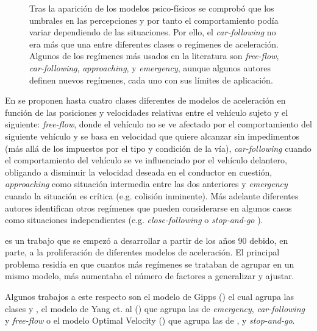 \begin{figure}
	\centering
	\caption{Tras la aparición de los modelos psico-físicos se comprobó que los umbrales en las percepciones y por tanto el comportamiento podía variar dependiendo de las situaciones. Por ello, el \textit{car-following} no era más que una entre diferentes clases o regímenes de aceleración. Algunos de los regímenes más usados en la literatura son \textit{free-flow}, \textit{car-following}, \textit{approaching}, y \textit{emergency}, aunque algunos autores definen nuevos regímenes, cada uno con sus límites de aplicación.}
	\label{fig:acceleration-model-classes}
\end{figure}

En \cite{wiedemann1992microscopic} se proponen hasta cuatro clases diferentes de modelos de aceleración en función de las posiciones y velocidades relativas entre el vehículo sujeto y el siguiente: \textit{free-flow}, donde el vehículo no se ve afectado por el comportamiento del siguiente vehículo y se basa en velocidad que quiere alcanzar sin impedimentos (más allá de los impuestos por el tipo y condición de la vía), \textit{car-following} cuando el comportamiento del vehículo se ve influenciado por el vehículo delantero, obligando a disminuir la velocidad deseada en el conductor en cuestión, \textit{approaching} como situación intermedia entre las dos anteriores y \textit{emergency} cuando la situación es crítica (e.g. colisión inminente). Más adelante diferentes autores identifican otros regímenes que pueden considerarse en algunos casos como situaciones independientes (e.g. \textit{close-following} o \textit{stop-and-go} \cite{Toledo2003, Liu2013}).

 es un trabajo que se empezó a desarrollar a partir de los años $90$ debido, en parte, a la proliferación de diferentes modelos de aceleración. El principal problema residía en que cuantos más regímenes se trataban de agrupar en un mismo modelo, más aumentaba el número de factores a generalizar y ajustar.

Algunos trabajos a este respecto son el modelo de Gipps (\cite{Gipps1981}) el cual agrupa las clases \textit{} y \textit{}, el modelo de Yang et. al (\cite{Yang1996}) que agrupa las de \textit{emergency}, \textit{car-following} y \textit{free-flow} o el modelo Optimal Velocity (\cite{Bando1998}) que agrupa las de \textit{}, \textit{} y \textit{stop-and-go}.


